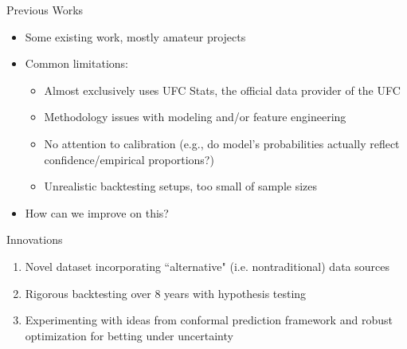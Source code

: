 \documentclass[aspectratio=169,xcolor=dvipsnames]{beamer}
\begin{document}

\begin{frame}{Previous Works}
    \begin{itemize}
        \item Some existing work, mostly amateur projects
    
        \item Common limitations:
        \begin{itemize}
            \item Almost exclusively uses UFC Stats, the official data provider of the UFC

            \item Methodology issues with modeling and/or feature engineering 

            \item No attention to calibration (e.g., do model's probabilities actually reflect confidence/empirical proportions?)

            \item Unrealistic backtesting setups, too small of sample sizes 
        \end{itemize}

        \item How can we improve on this?
    \end{itemize}
\end{frame}


\begin{frame}{Innovations}
    \begin{enumerate}
        \item Novel dataset incorporating ``alternative" (i.e. nontraditional) data sources

        \item Rigorous backtesting over 8 years with hypothesis testing

        \item Experimenting with ideas from conformal prediction framework and robust optimization for betting under uncertainty
    \end{enumerate}
\end{frame}

\end{document}
